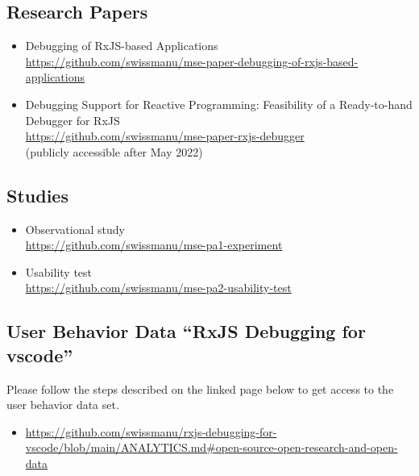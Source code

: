 \subsection*{Research Papers}
\begin{itemize}
  \item Debugging of RxJS-based Applications \\ \url{https://github.com/swissmanu/mse-paper-debugging-of-rxjs-based-applications}
  \item Debugging Support for Reactive Programming: Feasibility of a Ready-to-hand Debugger for RxJS \\ \url{https://github.com/swissmanu/mse-paper-rxjs-debugger} \\ (publicly accessible after May 2022)
\end{itemize}

\subsection*{Studies}
\begin{itemize}
  \item Observational study \\ \url{https://github.com/swissmanu/mse-pa1-experiment}
  \item Usability test \\ \url{https://github.com/swissmanu/mse-pa2-usability-test}
\end{itemize}

\subsection*{User Behavior Data ``RxJS Debugging for vscode''}

Please follow the steps described on the linked page below to get access to the user behavior data set.

\begin{itemize}
  \item \url{https://github.com/swissmanu/rxjs-debugging-for-vscode/blob/main/ANALYTICS.md\#open-source-open-research-and-open-data}
\end{itemize}

